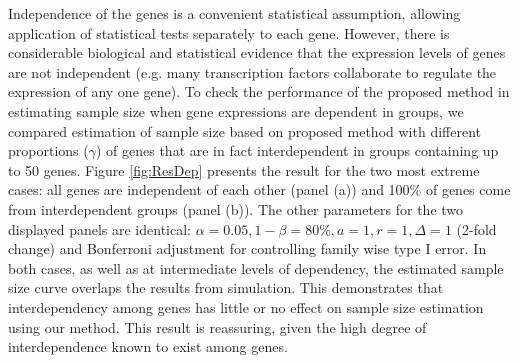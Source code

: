 \documentclass[12pt]{article}
\begin{document}
Independence of the genes is a convenient statistical assumption,
allowing application of statistical tests separately to each
gene. However, there is considerable biological and statistical
evidence that the expression levels of genes are not independent
(e.g. many transcription factors collaborate to regulate the
expression of any one gene). To check the performance of the
proposed method in estimating sample size when gene expressions are
dependent in groups, we compared estimation of sample size based on
proposed method with different proportions ($\gamma$) of genes that
are in fact interdependent in groups containing up to 50
genes. Figure
\ref{fig:ResDep} presents the result for the two most extreme cases:
all genes are independent of each other (panel (a)) and 100\% of
genes come from interdependent groups (panel (b)). The other
parameters for the two displayed panels are identical: $\alpha =
0.05, 1 - \beta = 80\%, a = 1, r = 1, \Delta = 1$ (2-fold change)
and Bonferroni adjustment for controlling family wise type I
error. In both cases, as well as at intermediate levels of
dependency, the estimated sample size curve overlaps the results
from simulation.  This demonstrates that interdependency among genes
has little or no effect on sample size estimation using our
method. This result is reassuring, given the high degree of
interdependence known to exist among genes.
\end{document}
